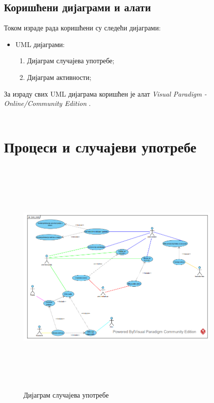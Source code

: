 \documentclass{article}
\begin{document}
\subsection{Коришћени дијаграми и алати}
Током израде рада коришћени су следећи дијаграми:
\begin{itemize}
    \item UML дијаграми:
        \begin{enumerate}
            \item Дијаграм случајева употребе;
            \item Дијаграм активности;
        \end{enumerate}
\end{itemize}

За израду свих UML дијаграма
коришћен је алат 
\textit{Visual Paradigm - Online/Community Edition} \cite{vs}.\\\\

\section{Процеси и случајеви употребе}

\begin{figure}[H]
\centering
\includegraphics[width=0.9\textwidth, height=12cm]{Dijagrami_slike/uc_diagram.png}
\caption{\label{fig:uc_diagram}Дијаграм случајева употребе}
\end{figure}
\end{document}
